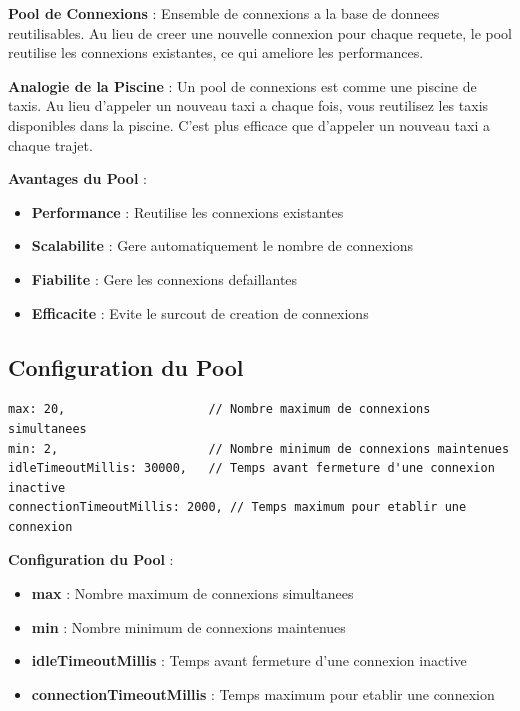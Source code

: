 \documentclass[a4paper,12pt]{book}
\begin{document}
\begin{definitionbox}
    \textbf{Pool de Connexions} : Ensemble de connexions a la base de donnees reutilisables. Au lieu de creer une nouvelle connexion pour chaque requete, le pool reutilise les connexions existantes, ce qui ameliore les performances.
\end{definitionbox}

\begin{analogybox}
    \textbf{Analogie de la Piscine} : Un pool de connexions est comme une piscine de taxis. Au lieu d'appeler un nouveau taxi a chaque fois, vous reutilisez les taxis disponibles dans la piscine. C'est plus efficace que d'appeler un nouveau taxi a chaque trajet.
\end{analogybox}

\textbf{Avantages du Pool} :
\begin{itemize}
    \item \textbf{Performance} : Reutilise les connexions existantes
    \item \textbf{Scalabilite} : Gere automatiquement le nombre de connexions
    \item \textbf{Fiabilite} : Gere les connexions defaillantes
    \item \textbf{Efficacite} : Evite le surcout de creation de connexions
\end{itemize}

\subsection{Configuration du Pool}

\begin{lstlisting}[style=javascript]
max: 20,                    // Nombre maximum de connexions simultanees
min: 2,                     // Nombre minimum de connexions maintenues
idleTimeoutMillis: 30000,   // Temps avant fermeture d'une connexion inactive
connectionTimeoutMillis: 2000, // Temps maximum pour etablir une connexion
\end{lstlisting}

\begin{definitionbox}
    \textbf{Configuration du Pool} :
    \begin{itemize}
        \item \textbf{max} : Nombre maximum de connexions simultanees
        \item \textbf{min} : Nombre minimum de connexions maintenues
        \item \textbf{idleTimeoutMillis} : Temps avant fermeture d'une connexion inactive
        \item \textbf{connectionTimeoutMillis} : Temps maximum pour etablir une connexion
    \end{itemize}
\end{definitionbox}
\end{document}
